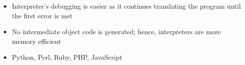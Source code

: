 \begin{itemize}
\begin{itemize}
        \item Interpreter's debugging is easier as it continues translating the program until the first error is met

        \item No intermediate object code is generated; hence, interpreters are more memory efficient

        \item Python, Perl, Ruby, PHP, JavaScript

      \end{itemize}

\end{itemize}



